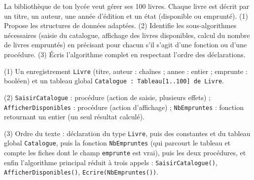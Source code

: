 \documentclass[11pt]{article}
\begin{document}
\begin{exercice}
La bibliothèque de ton lycée veut gérer ses 100 livres. Chaque livre est décrit par un titre, un auteur, une année d'édition et un état (disponible ou emprunté). (1) Propose les structures de données adaptées. (2) Identifie les sous-algorithmes nécessaires (saisie du catalogue, affichage des livres disponibles, calcul du nombre de livres empruntés) en précisant pour chacun s'il s'agit d'une fonction ou d'une procédure. (3) Écris l'algorithme complet en respectant l'ordre des déclarations.
\end{exercice}

\begin{corrige}
(1) Un enregistrement \texttt{Livre} (titre, auteur : chaînes ; annee : entier ; emprunte : booléen) et un tableau global \texttt{Catalogue : Tableau[1..100] de Livre}.

(2) \texttt{SaisirCatalogue} : procédure (action de saisie, plusieurs effets) ; \texttt{AfficherDisponibles} : procédure (action d'affichage) ; \texttt{NbEmpruntes} : fonction retournant un entier (un seul résultat calculé).

(3) Ordre du texte : déclaration du type \texttt{Livre}, puis des constantes et du tableau global \texttt{Catalogue}, puis la fonction \texttt{NbEmpruntes} (qui parcourt le tableau et compte les fiches dont le champ \texttt{emprunte} est vrai), puis les deux procédures, et enfin l'algorithme principal réduit à trois appels : \texttt{SaisirCatalogue()}, \texttt{AfficherDisponibles()}, \texttt{Ecrire(NbEmpruntes())}.
\end{corrige}
\end{document}
